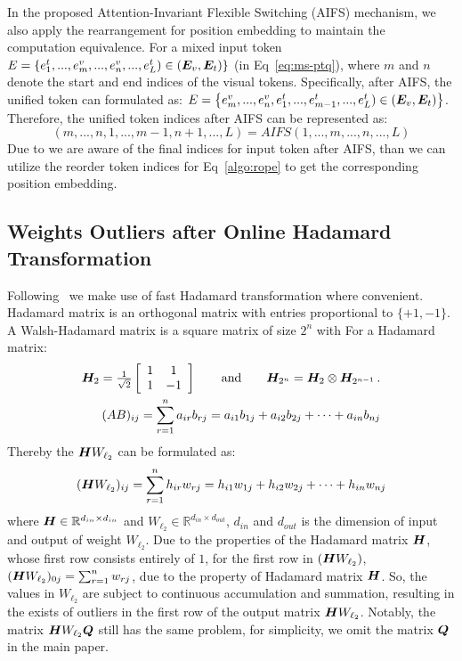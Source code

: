 In the proposed Attention-Invariant Flexible Switching (AIFS) mechanism, we also apply the rearrangement for position embedding to maintain the computation equivalence. For a mixed input token $E = \left\{e^t_1,...,e^v_m,...,e^v_n,...,e^t_L) \in (\boldsymbol{E}_v,\boldsymbol{E}_t)\right\}$ (in Eq~\ref{eq:ms-ptq}), where $m$ and $n$ denote the start and end indices of the visual tokens. Specifically, after AIFS, the unified token can formulated as: $E = \left\{e^v_m,...,e^v_n,e^t_1,...,e^t_{m-1},...,e^t_L) \in (\boldsymbol{E}_v,\boldsymbol{E}_t)\right\}$. Therefore, the unified token indices after AIFS can be represented as:
\begin{equation}
(m,...,n,1,...,{m-1},{n+1},...,L) = AIFS{(1,...,m,...,n,...,L)}
\end{equation}
Due to we are aware of the final indices for input token after AIFS, than we can utilize the reorder token indices for Eq~\ref{algo:rope} to get the corresponding position embedding.

\subsection{Weights Outliers after Online Hadamard Transformation} 
\label{weight_outliers}
Following~\citep{tseng2024quip+,ashkboos2024quarot} we make use of fast Hadamard transformation where convenient. Hadamard matrix is an orthogonal matrix with entries proportional to $\{+1, -1\}$. A Walsh-Hadamard matrix is a square matrix of size $2^n$ with For a Hadamard matrix:
\begin{align}
    \mH_2 = \tfrac{1}{\sqrt{2}}\left[\begin{array}{cc}
    1&1\\1&-1\end{array}\right]
    \qquad\textrm{and} \qquad \mH_{2^n} = \mH_2 \otimes \mH_{2^{n-1}}\,. \\
    (AB)_{ij} = \sum_{r=1}^{n} a_{ir} b_{rj} = a_{i1} b_{1j} + a_{i2} b_{2j} + \cdots + a_{in} b_{nj}
\vspace{-4mm}
\end{align}
Thereby the $\boldsymbol{H} W_{\ell_2}$ can be formulated as:
\vspace{-2mm}
\begin{align}
    (\mH W_{\ell_2})_{ij} = \sum_{r=1}^{n} h_{ir} w_{rj} = h_{i1} w_{1j} + h_{i2} w_{2j} + \cdots + h_{in} w_{nj}
\vspace{-4mm}
\end{align}
where $\boldsymbol{H}\in\mathbb{R}^{d_{in} \times d_{in}}$ and $W_{\ell_2} \in\mathbb{R}^{d_{in} \times d_{out}}$, $d_{in}$ and $d_{out}$ is the dimension of input and output of weight $W_{\ell_2}$. Due to the properties of the Hadamard matrix $\boldsymbol{H}$, whose first row consists entirely of $1$, for the first row in $(\boldsymbol{H} W_{\ell_2})$, $(\boldsymbol{H} W_{\ell_2})_{0j} = \sum_{r=1}^{n} w_{rj}$, due to the property of Hadamard matrix $\boldsymbol{H}$. So, the values in $W_{\ell_2}$ are subject to continuous accumulation and summation, resulting in the exists of outliers in the first row of the output matrix $\boldsymbol{H} W_{\ell_2}$. Notably, the matrix $\boldsymbol{H} W_{\ell_2}\boldsymbol{Q}$ still has the same problem, for simplicity, we omit the matrix $\boldsymbol{Q}$ in the main paper. 

